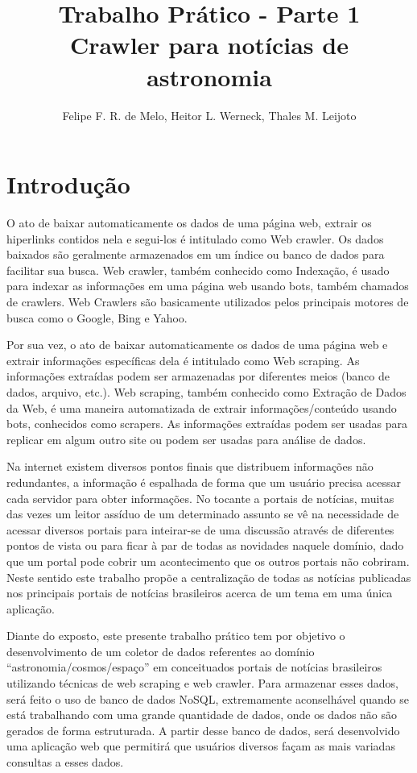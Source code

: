 \documentclass{article}
\title{Trabalho Prático - Parte 1 \\
\large Crawler para notícias de astronomia}
\author{Felipe F. R. de Melo, Heitor L. Werneck, Thales M. Leijoto}
\begin{document}
\maketitle
\section{Introdução}
O ato de baixar automaticamente os dados de uma página web, extrair os hiperlinks contidos nela e segui-los é intitulado como Web crawler. Os dados baixados são geralmente armazenados em um índice ou banco de dados para facilitar sua busca. Web crawler, também conhecido como Indexação, é usado para indexar as informações em uma página web usando bots, também chamados de crawlers. Web Crawlers são basicamente utilizados pelos principais motores de busca como o Google, Bing e Yahoo.

Por sua vez, o ato de baixar automaticamente os dados de uma página web e extrair informações específicas dela é intitulado como Web scraping. As informações extraídas podem ser armazenadas por diferentes meios (banco de dados, arquivo, etc.). Web scraping, também conhecido como Extração de Dados da Web, é uma maneira automatizada de extrair informações/conteúdo usando bots, conhecidos como scrapers. As informações extraídas podem ser usadas para replicar em algum outro site ou podem ser usadas para análise de dados.

Na internet existem diversos pontos finais que distribuem informações não redundantes, a informação é espalhada de forma que um usuário precisa acessar cada servidor para obter informações. No tocante a portais de notícias, muitas das vezes um leitor assíduo de um determinado assunto se vê na necessidade de acessar diversos portais para inteirar-se de uma discussão através de diferentes pontos de vista ou para ficar à par de todas as novidades naquele domínio, dado que um portal pode cobrir um acontecimento que os outros portais não cobriram. Neste sentido este trabalho propõe a centralização de todas as notícias publicadas nos principais portais de notícias brasileiros acerca de um tema em uma única aplicação.

Diante do exposto, este presente trabalho prático tem por objetivo o desenvolvimento de um coletor de dados referentes ao domínio “astronomia/cosmos/espaço” em conceituados portais de notícias brasileiros utilizando técnicas de web scraping e web crawler. Para armazenar esses dados, será feito o uso de banco de dados NoSQL, extremamente aconselhável quando se está trabalhando com uma grande quantidade de dados, onde os dados não são gerados de forma estruturada. A partir desse banco de dados, será desenvolvido uma aplicação web que permitirá que usuários diversos façam as mais variadas consultas a esses dados.
\end{document}
